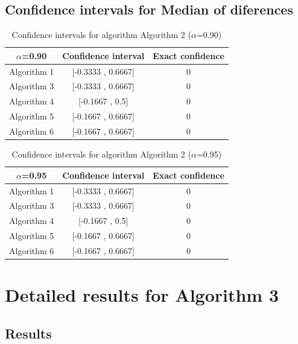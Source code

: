 \documentclass[a4paper,10pt]{article}
\begin{document}
\subsection{Confidence intervals for Median of diferences}

\begin{table}[!htp]
\centering\small
\begin{tabular}{
|c|c|c|}
\hline
 $\alpha$=0.90 & Confidence interval & Exact confidence \\ \hline 
Algorithm 1 & [-0.3333 , 0.6667] & 0\\ \hline 
Algorithm 3 & [-0.3333 , 0.6667] & 0\\ \hline 
Algorithm 4 & [-0.1667 , 0.5] & 0\\ \hline 
Algorithm 5 & [-0.1667 , 0.6667] & 0\\ \hline 
Algorithm 6 & [-0.1667 , 0.6667] & 0\\ \hline 

\end{tabular}
\caption{Confidence intervals for algorithm Algorithm 2 ($\alpha$=0.90)}
\end{table}
\begin{table}[!htp]
\centering\small
\begin{tabular}{
|c|c|c|}
\hline
 $\alpha$=0.95 & Confidence interval & Exact confidence \\ \hline 
Algorithm 1 & [-0.3333 , 0.6667] & 0\\ \hline 
Algorithm 3 & [-0.3333 , 0.6667] & 0\\ \hline 
Algorithm 4 & [-0.1667 , 0.5] & 0\\ \hline 
Algorithm 5 & [-0.1667 , 0.6667] & 0\\ \hline 
Algorithm 6 & [-0.1667 , 0.6667] & 0\\ \hline 

\end{tabular}
\caption{Confidence intervals for algorithm Algorithm 2 ($\alpha$=0.95)}
\end{table}

 \clearpage 


\section{Detailed results for Algorithm 3}


\subsection{Results}
\end{document}
